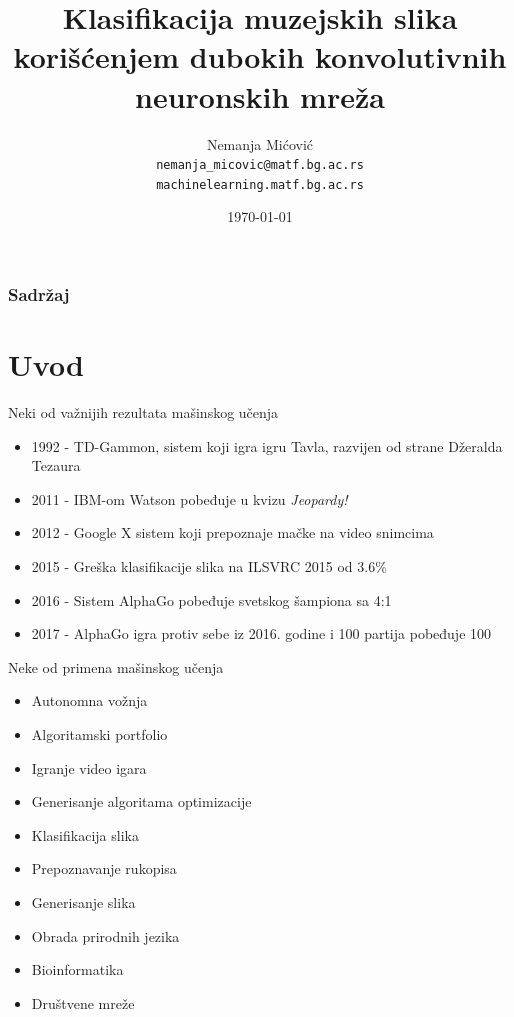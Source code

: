 \documentclass{beamer}
\title[]{Klasifikacija muzejskih slika korišćenjem dubokih konvolutivnih neuronskih mreža}
\author{Nemanja Mićović \\ \texttt{nemanja\_micovic@matf.bg.ac.rs} \\ \texttt{machinelearning.matf.bg.ac.rs}}
\institute[MATF]{Matematički fakultet \\ Univerzitet u Beogradu}
\date{\today}
\begin{document}
\begin{frame}
    \titlepage
\end{frame}

\begin{frame}
\frametitle{Sadržaj}
\tableofcontents
\end{frame}

\section{Uvod}
\begin{frame}{Neki od važnijih rezultata mašinskog učenja}
    \begin{itemize}
        \item 1992 - TD-Gammon, sistem koji igra igru Tavla, razvijen od strane Džeralda Tezaura
        \item 2011 - IBM-om Watson pobeđuje u kvizu \textit{Jeopardy!}
        \item 2012 - Google X sistem koji prepoznaje mačke na video snimcima
        \item 2015 - Greška klasifikacije slika na ILSVRC 2015 od 3.6\%
        \item 2016 - Sistem AlphaGo pobeđuje svetskog šampiona sa 4:1
        \item 2017 - AlphaGo igra protiv sebe iz 2016. godine i 100 partija pobeđuje 100
    \end{itemize}
\end{frame}
\begin{frame}{Neke od primena mašinskog učenja}
    \begin{itemize}
        \item Autonomna vožnja
        \item Algoritamski portfolio
        \item Igranje video igara
        \item Generisanje algoritama optimizacije \cite{learning-to-learn}
        \item Klasifikacija slika
        \item Prepoznavanje rukopisa
        \item Generisanje slika
        \item Obrada prirodnih jezika
        \item Bioinformatika
        \item Društvene mreže
    \end{itemize} 
\end{frame}
\end{document}
